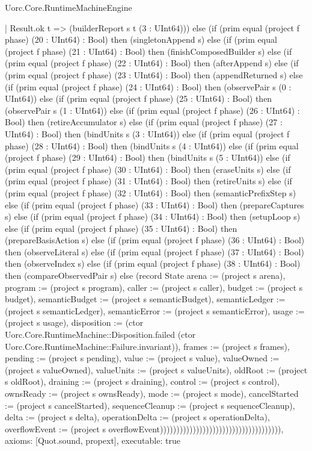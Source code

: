 \begin{lexlean}{Uorc.Core.RuntimeMachineEngine}
\begin{semanticmodule}
{      | Result.ok t => (builderReport s t (3 : UInt64))) else (if (prim equal (project f phase) (20 : UInt64) : Bool) then (singletonAppend s) else (if (prim equal (project f phase) (21 : UInt64) : Bool) then (finishComposedBuilder s) else (if (prim equal (project f phase) (22 : UInt64) : Bool) then (afterAppend s) else (if (prim equal (project f phase) (23 : UInt64) : Bool) then (appendReturned s) else (if (prim equal (project f phase) (24 : UInt64) : Bool) then (observePair s (0 : UInt64)) else (if (prim equal (project f phase) (25 : UInt64) : Bool) then (observePair s (1 : UInt64)) else (if (prim equal (project f phase) (26 : UInt64) : Bool) then (retireAccumulator s) else (if (prim equal (project f phase) (27 : UInt64) : Bool) then (bindUnits s (3 : UInt64)) else (if (prim equal (project f phase) (28 : UInt64) : Bool) then (bindUnits s (4 : UInt64)) else (if (prim equal (project f phase) (29 : UInt64) : Bool) then (bindUnits s (5 : UInt64)) else (if (prim equal (project f phase) (30 : UInt64) : Bool) then (eraseUnits s) else (if (prim equal (project f phase) (31 : UInt64) : Bool) then (retireUnits s) else (if (prim equal (project f phase) (32 : UInt64) : Bool) then (semanticPrefixStep s) else (if (prim equal (project f phase) (33 : UInt64) : Bool) then (prepareCaptures s) else (if (prim equal (project f phase) (34 : UInt64) : Bool) then (setupLoop s) else (if (prim equal (project f phase) (35 : UInt64) : Bool) then (prepareBasisAction s) else (if (prim equal (project f phase) (36 : UInt64) : Bool) then (observeLiteral s) else (if (prim equal (project f phase) (37 : UInt64) : Bool) then (observeIndex s) else (if (prim equal (project f phase) (38 : UInt64) : Bool) then (compareObservedPair s) else (record State {arena := (project s arena), program := (project s program), caller := (project s caller), budget := (project s budget), semanticBudget := (project s semanticBudget), semanticLedger := (project s semanticLedger), semanticError := (project s semanticError), usage := (project s usage), disposition := (ctor Uorc.Core.RuntimeMachine::Disposition.failed (ctor Uorc.Core.RuntimeMachine::Failure.invariant)), frames := (project s frames), pending := (project s pending), value := (project s value), valueOwned := (project s valueOwned), valueUnits := (project s valueUnits), oldRoot := (project s oldRoot), draining := (project s draining), control := (project s control), ownsReady := (project s ownsReady), mode := (project s mode), cancelStarted := (project s cancelStarted), sequenceCleanup := (project s sequenceCleanup), delta := (project s delta), operationDelta := (project s operationDelta), overflowEvent := (project s overflowEvent)})))))))))))))))))))))))))))))))))))),
  axioms: [Quot.sound, propext],
  executable: true
}


\end{semanticmodule}
\end{lexlean}
